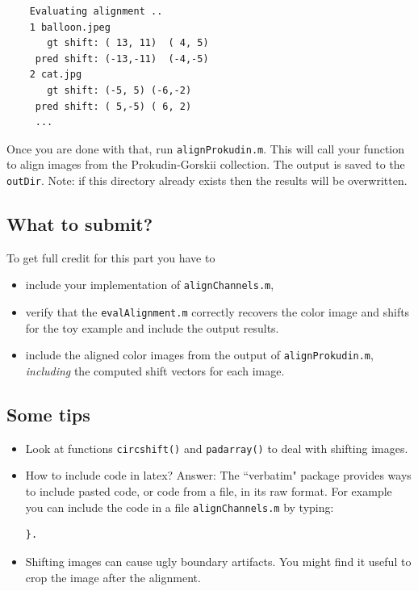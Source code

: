 \documentclass[10pt,letterpaper]{article}
\newcommand{\cmd}[1] {{\color{blue}\texttt{#1}}}
\begin{document}
\begin{verbatim}
    Evaluating alignment ..
    1 balloon.jpeg
	   gt shift: ( 13, 11)  ( 4, 5)
	 pred shift: (-13,-11)  (-4,-5)
    2 cat.jpg
	   gt shift: (-5, 5) (-6,-2)
	 pred shift: ( 5,-5) ( 6, 2)
     ...
\end{verbatim}
    
Once you are done with that, run \cmd{alignProkudin.m}. This will call your function to align images from the Prokudin-Gorskii collection. The output is saved to the \cmd{outDir}. Note: if this directory already exists then the results will be overwritten.


\subsection{What to submit?}
To get full credit for this part you have to 
\begin{itemize}
\item include your implementation of \cmd{alignChannels.m},
\item verify that the \cmd{evalAlignment.m} correctly recovers the color image and shifts for the toy example and include the output results.
\item include the aligned color images from the output of \cmd{alignProkudin.m},
\emph{including} the computed shift vectors for each image.
\end{itemize}

\subsection{Some tips}
\begin{itemize}
\item Look at functions \cmd{circshift()} and \cmd{padarray()} to deal with shifting images.

\item How to include code in latex? Answer: The ``verbatim" package provides ways to include pasted code, or code from a file, in its raw format. For example you can include the code in a file \cmd{alignChannels.m} by typing: 
\begin{verbatim}
}.
\end{verbatim}

\item Shifting images can cause ugly boundary artifacts. You might find it useful to crop the image after the alignment.
\end{itemize}
\end{document}
